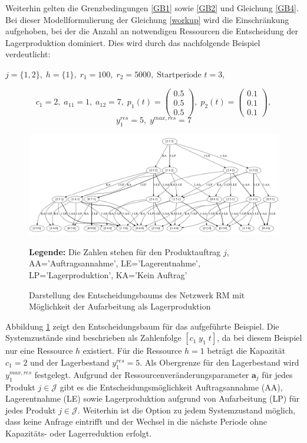 Weiterhin gelten die Grenzbedingungen \eqref{GB1} sowie \eqref{GB2} und Gleichung \eqref{GB4}. Bei dieser Modellformulierung der Gleichung \eqref{workup} wird die Einschränkung aufgehoben, bei der die Anzahl an notwendigen Ressourcen die Entscheidung der Lagerproduktion dominiert. Dies wird durch das nachfolgende Beispiel verdeutlicht:
\begin{center}
$j = \{1, 2\}, \; h = \{1\}, \; r_{1} = 100, \; r_{2} = 5000, \; \text{Startperiode } t=3$,
\end{center}
\[
    c_{1}=2, \;
    a_{11}=1, \;
     a_{12}=7, \;
     p_{1}(t)=\begin{pmatrix} 0.5\\ 0.5\\ 0.5  \end{pmatrix}, \;
     p_{2}(t)=\begin{pmatrix} 0.1\\ 0.1\\ 0.1  \end{pmatrix},
  \]
  \[
    y_{1}^{res}= 5, \;
    y^{max,res}=7
      \]
\begin{figure}[h!]
  \begin{center}
    \includegraphics[width=130mm]{Bilder/Beispiel5.pdf}
    \caption{Darstellung des Entscheidungsbaums des Netzwerk RM mit Möglichkeit der Aufarbeitung als Lagerproduktion}  \label{B5}
    {\footnotesize \textbf{Legende:} Die Zahlen stehen für den Produktauftrag $j$, AA='Auftragsannahme', LE='Lagerentnahme', LP='Lagerproduktion', KA='Kein Auftrag'} 
  \end{center}
\end{figure}

Abbildung \ref{B5} zeigt den Entscheidungsbaum für das aufgeführte Beispiel. Die Systemzustände sind beschrieben als Zahlenfolge $[c_{1}\; y_{1}\;t]$, da bei diesem Beispiel nur eine Ressource $h$ existiert. Für die Ressource $h=1$ beträgt die Kapazität $c_{1}=2$ und der Lagerbestand $y_{1}^{res}=5$. Als Obergrenze für den Lagerbestand wird $y_{1}^{max,res}$ festgelegt. Aufgrund der Ressourcenveränderungsparameter $\textbf{a}_{j}$ für jedes Produkt $j\in\mathcal{J}$ gibt es die Entscheidungsmöglichkeit Auftragsannahme (AA), Lagerentnahme (LE) sowie Lagerproduktion aufgrund von Aufarbeitung (LP) für jedes Produkt $j\in\mathcal{J}$. Weiterhin ist die Option zu jedem Systemzustand möglich, dass keine Anfrage eintrifft und der Wechsel in die nächste Periode ohne Kapazitäts- oder Lagerreduktion erfolgt.

